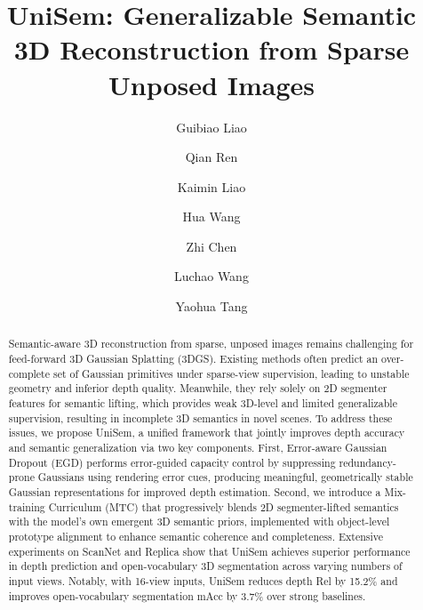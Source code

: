 \documentclass[runningheads]{llncs}
\begin{document}
\title{UniSem: Generalizable Semantic 3D Reconstruction from Sparse Unposed Images} 




\author{Guibiao Liao \and
Qian Ren \and 
Kaimin Liao \and 
Hua Wang \and 
Zhi Chen \and 
Luchao Wang \and
Yaohua Tang
}


\vspace{-10mm}

\maketitle


\begin{abstract}

    Semantic-aware 3D reconstruction from sparse, unposed images remains challenging for feed-forward 3D Gaussian Splatting (3DGS). 
    Existing methods often predict an over-complete set of Gaussian primitives under sparse-view supervision, leading to unstable geometry and inferior depth quality. 
    Meanwhile, they rely solely on 2D segmenter features for semantic lifting, which provides weak 3D-level and limited generalizable supervision, resulting in incomplete 3D semantics in novel scenes.
    To address these issues, we propose UniSem, a unified framework that jointly improves depth accuracy and semantic generalization via two key components. 
    First, Error-aware Gaussian Dropout (EGD) performs error-guided capacity control by suppressing redundancy-prone Gaussians using rendering error cues, producing meaningful, geometrically stable Gaussian representations for improved depth estimation. 
    Second, we introduce a Mix-training Curriculum (MTC) that progressively blends 2D segmenter-lifted semantics with the model’s own emergent 3D semantic priors, implemented with object-level prototype alignment to enhance semantic coherence and completeness.
    Extensive experiments on ScanNet and Replica show that UniSem achieves superior performance in depth prediction and open-vocabulary 3D segmentation across varying numbers of input views. 
    Notably, with 16-view inputs, UniSem reduces depth Rel by 15.2\% and improves open-vocabulary segmentation mAcc by 3.7\% over strong baselines. 
    
\end{abstract}
\end{document}
